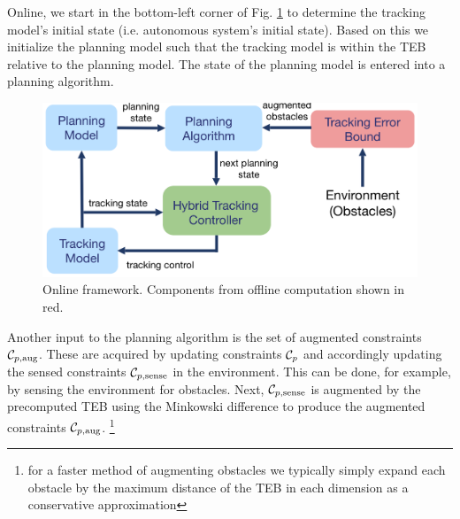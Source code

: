 Online, we start in the bottom-left corner of Fig. \ref{fig:fw_online} to determine the tracking model's initial state (i.e. autonomous system's initial state). Based on this we initialize the planning model such that the tracking model is within the TEB relative to the planning model. The state of the planning model is entered into a planning algorithm.  
\begin{figure}[h!]
	\centering
	\includegraphics[width=1\columnwidth]{fig/framework_online_2}
	\caption{Online framework. Components from offline computation shown in red.}
	\label{fig:fw_online}
\end{figure}
Another input to the planning algorithm is the set of augmented constraints $\mathcal C_{p,\text{aug}}$.  These are acquired by updating constraints $\mathcal C_p$ and accordingly updating the sensed constraints $\mathcal C_{p,\text{sense}}$ in the environment.  This can be done, for example, by sensing the environment for obstacles. Next, $\mathcal C_{p,\text{sense}}$ is augmented  by the precomputed TEB using the Minkowski difference to produce the augmented constraints $\mathcal C_{p,\text{aug}}$. \footnote{for a faster method of augmenting obstacles we typically simply expand each obstacle by the maximum distance of the TEB in each dimension as a conservative approximation}




